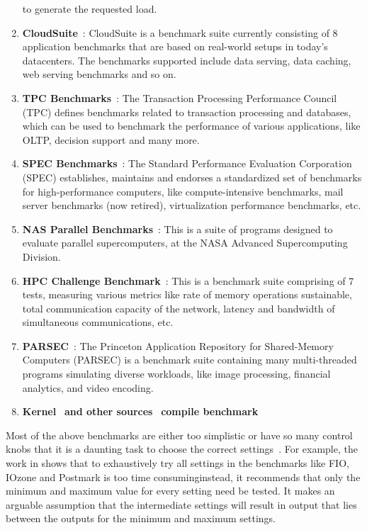 \begin{enumerate}
		  to generate the requested load.
	\item \textbf{CloudSuite}~\cite{cloudsuite}: CloudSuite is a benchmark
		  suite currently consisting of 8 application benchmarks that are
		  based on real-world setups in today's datacenters. The benchmarks
		  supported include data serving, data caching, web serving 
		  benchmarks and so on.
	\item \textbf{TPC Benchmarks}~\cite{tpc}: The Transaction Processing
		Performance Council (TPC) defines benchmarks related to transaction
		processing and databases, which can be used to benchmark the 
		performance of various applications, like OLTP, decision support
		and many more.
	\item \textbf{SPEC Benchmarks}~\cite{spec}: The Standard Performance 
		Evaluation Corporation (SPEC) establishes, maintains and endorses
		a standardized set of benchmarks for high-performance computers,
		like compute-intensive benchmarks, mail server benchmarks (now retired),
		virtualization performance benchmarks, etc.
	\item \textbf{NAS Parallel Benchmarks}~\cite{nasa}: This is a suite of
		programs designed to evaluate parallel supercomputers, at the
		NASA Advanced Supercomputing Division.
	\item \textbf{HPC Challenge Benchmark}~\cite{hpcc}: This is a benchmark
		suite comprising of 7 tests, measuring various metrics like rate of memory
		operations sustainable, total communication capacity of the network,
		latency and bandwidth of simultaneous communications, etc.
	\item \textbf{PARSEC}~\cite{parsec}: The Princeton Application Repository for 
		Shared-Memory Computers (PARSEC) is a benchmark suite containing many
		multi-threaded programs simulating diverse workloads, like image
		processing, financial analytics, and video encoding.
	\item \textbf{Kernel}~\cite{kernel-src} \textbf{and other sources}~\cite{am-utils, emacs} \textbf{compile benchmark}
\end{enumerate}		

Most of the above benchmarks are either too simplistic or have so many 
control knobs that it is a daunting task to choose the correct 
settings~\cite{generating-datasets}. For example, the work in 
\cite{storage-benchmark-coverage} shows that to exhaustively try all
settings in the benchmarks like FIO, IOzone and Postmark is too time
consuming\textemdash{}instead, 
it recommends that only the minimum and maximum
value for every setting need be tested. It makes an arguable assumption 
that the intermediate settings will result in output that lies between
the outputs for the minimum and maximum settings.

